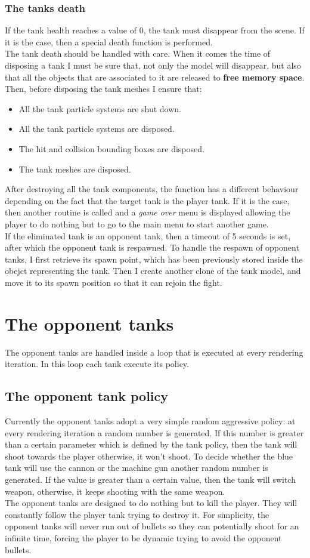 \documentclass[14pt]{article}
\begin{document}
\subsubsection{The tanks death}
If the tank health reaches a value of 0, the tank must disappear from the scene. If it is the case, then a special death function is performed. \\
The tank death should be handled with care. When it comes the time of disposing a tank I must be sure that, not only the model will disappear, but also that all the objects that are associated to it are released to \textbf{free memory space}. Then, before disposing the tank meshes I ensure that:
\begin{itemize}
\item All the tank particle systems are shut down.
\item All the tank particle systems are disposed.
\item The hit and collision bounding boxes are disposed.
\item The tank meshes are disposed.
\end{itemize}
After destroying all the tank components, the function has a different behaviour depending on the fact that the target tank is the player tank. If it is the case, then another routine is called and a \textit{game over} menu is displayed allowing the player to do nothing but to go to the main menu to start another game.\\
If the eliminated tank is an opponent tank, then a timeout of 5 seconds is set, after which the opponent tank is respawned. To handle the respawn of opponent tanks, I first retrieve its spawn point, which has been previously stored inside the obejct representing the tank. Then I create another clone of the tank model, and move it to its spawn position so that it can rejoin the fight.

\section{The opponent tanks}
The opponent tanks are handled inside a loop that is executed at every rendering iteration. In this loop each tank execute its policy.
\subsection{The opponent tank policy}
Currently the opponent tanks adopt a very simple random aggressive policy: at every rendering iteration a random number is generated. If this number is greater than a certain parameter which is defined by the tank policy, then the tank will shoot towards the player otherwise, it won't shoot. To decide whether the blue tank will use the cannon or the machine gun another random number is generated. If the value is greater than a certain value, then the tank will switch weapon, otherwise, it keeps shooting with the same weapon. \\
The opponent tanks are designed to do nothing but to kill the player. They will constantly follow the player tank trying to destroy it. For simplicity, the opponent tanks will never run out of bullets so they can potentially shoot for an infinite time, forcing the player to be dynamic trying to avoid the opponent bullets.\\
\end{document}
